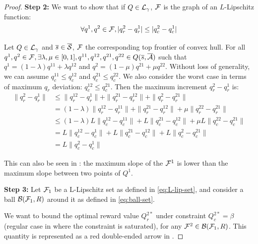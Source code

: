 \begin{proof}
\textbf{Step 2:} We want to show that if $Q\in\mathcal{L}_\gamma$, $\mathcal{F}$ is the graph of an $L$-Lipschitz function:
\begin{equation}
\label{eq:L-lip-set}
    \forall q^1,q^2\in\mathcal{F}, |q_r^2-q_r^1| \leq |q_c^2-q_c^1|
\end{equation}

Let $Q\in\mathcal{L}_\gamma$ and $\overline{s}\in\overline{\mathcal{S}}$, $\mathcal{F}$ the corresponding top frontier of convex hull.
For all $q^1,q^2\in\mathcal{F}, \exists \lambda,\mu\in[0,1], q^{11},q^{12},q^{21},q^{22}\in Q(\overline{s},\overline{\mathcal{A}})$ such that $q^1 = (1-\lambda)q^{11} + \lambda q^{12}$ and $q^2 = (1-\mu)q^{21} + \mu q^{22}$.
Without loss of generality, we can assume $q_c^{11}\leq q_c^{12}$ and $q_c^{21}\leq q_c^{22}$. We also consider the worst case in terms of maximum $q_r$ deviation: $q_c^{12} \leq q_c^{21}$.
Then the maximum increment $q_r^2-q_r^{1}$ is:
\begin{align*}
    \|q^2_r-q^{1}_r\| &\leq \|q^{12}_r-q^{1}_r\| + \|q^{21}_r-q^{12}_r\| + \|q^{2}_r-q^{21}_r\| \\
    &= (1-\lambda)\|q^{12}_r-q^{11}_r\| + \|q^{21}_r-q^{12}_r\| + \mu\|q^{22}_r-q^{21}_r\| \\ 
    &\leq (1-\lambda)L\|q^{12}_c-q^{11}_c\| + L\|q^{21}_c-q^{12}_c\| + \mu L\|q^{22}_c-q^{21}_c\| \\
    &= L\|q^{12}_c-q^{1}_c\| + L\|q^{21}_c-q^{12}_c\| + L\|q^{2}_c-q^{21}_c\|\\
    &= L\|q^{2}_c-q^{1}_c\|
\end{align*}

This can also be seen in : the maximum slope of the $\mathcal{F}^1$ is lower than the maximum slope between two points of $Q^1$.

\textbf{Step 3:} Let $\mathcal{F}_1$ be a L-Lipschitz set as defined in \eqref{eq:L-lip-set}, and consider a ball $\mathcal{B}(\mathcal{F}_1,R)$ around it as defined in \eqref{eq:ball-set}.

We want to bound the optimal reward value $Q_r^{2*}$ under constraint $Q_c^{2*} = \beta$ (regular case in  where the constraint is saturated), for any $\mathcal{F}^2\in\mathcal{B}(\mathcal{F}_1,R)$. This quantity is represented as a red double-ended arrow in .


\end{proof}
